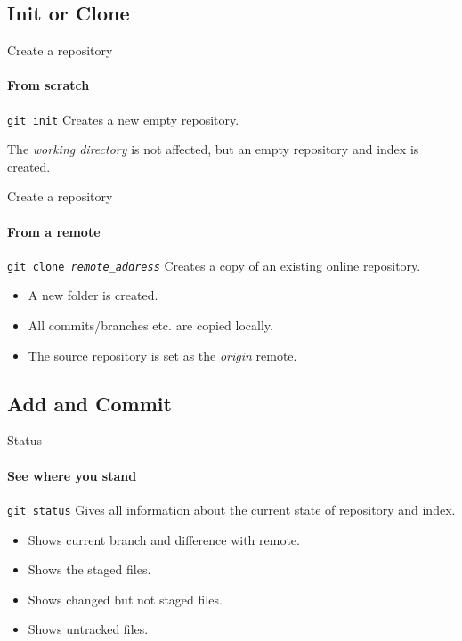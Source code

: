 \documentclass[aspectratio=169]{beamer}
\begin{document}
\subsection{Init or Clone}

\begin{frame}{Create a repository}
\framesubtitle{From scratch}

\begin{block}{	\texttt{git init}}
 	Creates a new empty repository.
 \end{block}

The \emph{working directory} is not affected, but an empty repository and index is created.

\end{frame}

\begin{frame}{Create a repository}
\framesubtitle{From a remote}

\begin{block}{	\texttt{git clone \emph{remote\_address}}}
	Creates a copy of an existing online repository.
\end{block}

\begin{itemize}
	\item A new folder is created.
	\item All commits/branches etc. are copied locally.
	\item The source repository is set as the \emph{origin} remote.
\end{itemize}

\end{frame}

\subsection{Add and Commit}

\begin{frame}{Status}
\framesubtitle{See where you stand}

\begin{block}{	\texttt{git status}}
	Gives all information about the current state of repository and index.
\end{block}

\begin{itemize}
	\item Shows current branch and difference with remote.
	\item Shows the staged files.
	\item Shows changed but not staged files.
	\item Shows untracked files.
\end{itemize}

\end{frame}
\end{document}
